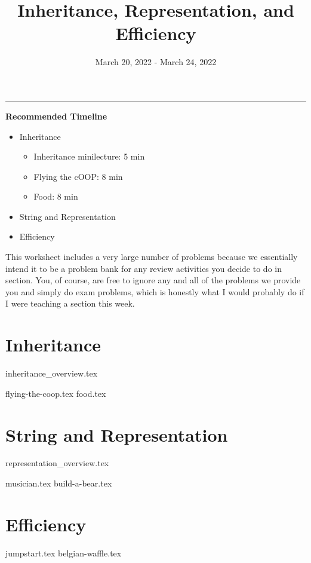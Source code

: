 \documentclass{exam}
\title{Inheritance, Representation, and Efficiency}
\date{March 20, 2022 - March 24, 2022}
\begin{document}
\maketitle
\rule{\textwidth}{0.15em}
\fontsize{12}{15}\selectfont

\begin{meta}
    \textbf{Recommended Timeline}
    \begin{itemize}
        \item Inheritance
        \begin{itemize}
            \item Inheritance minilecture: 5 min
            \item Flying the cOOP: 8 min
            \item Food: 8 min
        \end{itemize}
        \item String and Representation
        \item Efficiency
    \end{itemize}
    This worksheet includes a very large number of problems because we essentially intend it to be a problem bank for any review activities you decide to do in section. You, of course, are free to ignore any and all of the problems we provide you and simply do exam problems, which is honestly what I would probably do if I were teaching a section this week. 
\end{meta}

\section{Inheritance}
{inheritance_overview.tex}
\begin{questions}
    {flying-the-coop.tex}
    \newpage
    {food.tex}
    \newpage
\end{questions}

\section{String and Representation}
{representation_overview.tex}
\begin{questions}
    {musician.tex}
    {build-a-bear.tex}
\end{questions}

\section{Efficiency}
\begin{questions}
    {jumpstart.tex}
    {belgian-waffle.tex}
\end{questions}
\end{document}
